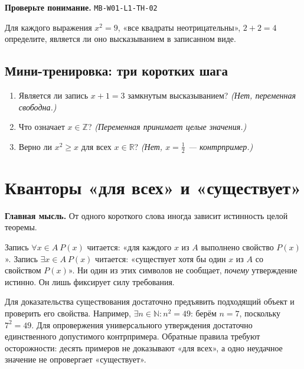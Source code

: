 \documentclass[11pt,a4paper,openany]{book}
\newcommand{\muid}[1]{\texttt{\footnotesize #1}}
\begin{document}
\begin{learnbox}\textbf{Проверьте понимание.} \muid{MB-W01-L1-TH-02}\par Для каждого выражения $x^2=9$, «все квадраты неотрицательны», $2+2=4$ определите, является ли оно высказыванием в записанном виде.\end{learnbox}

\subsection*{Мини-тренировка: три коротких шага}
\begin{enumerate}[label=\arabic*),leftmargin=*,itemsep=3pt]

\item Является ли запись $x+1=3$ замкнутым высказыванием? \textit{(Нет, переменная свободна.)}

\item Что означает $x\in\mathbb Z$? \textit{(Переменная принимает целые значения.)}

\item Верно ли $x^2\ge x$ для всех $x\in\mathbb R$? \textit{(Нет, $x=\tfrac12$ — контрпример.)}

\end{enumerate}

\medskip

\section{Кванторы «для всех» и «существует»}\label{theory:3}

\begin{keybox}\textbf{Главная мысль.} От одного короткого слова иногда зависит истинность целой теоремы.\end{keybox}

Запись $\forall x\in A\ P(x)$ читается: «для каждого $x$ из $A$ выполнено свойство $P(x)$». Запись $\exists x\in A\ P(x)$ читается: «существует хотя бы один $x$ из $A$ со свойством $P(x)$». Ни один из этих символов не сообщает, \emph{почему} утверждение истинно. Он лишь фиксирует силу требования.


Для доказательства существования достаточно предъявить подходящий объект и проверить его свойства. Например, $\exists n\in\mathbb N\colon n^2=49$: берём $n=7$, поскольку $7^2=49$. Для опровержения универсального утверждения достаточно единственного допустимого контрпримера. Обратные правила требуют осторожности: десять примеров не доказывают «для всех», а одно неудачное значение не опровергает «существует».
\end{document}
